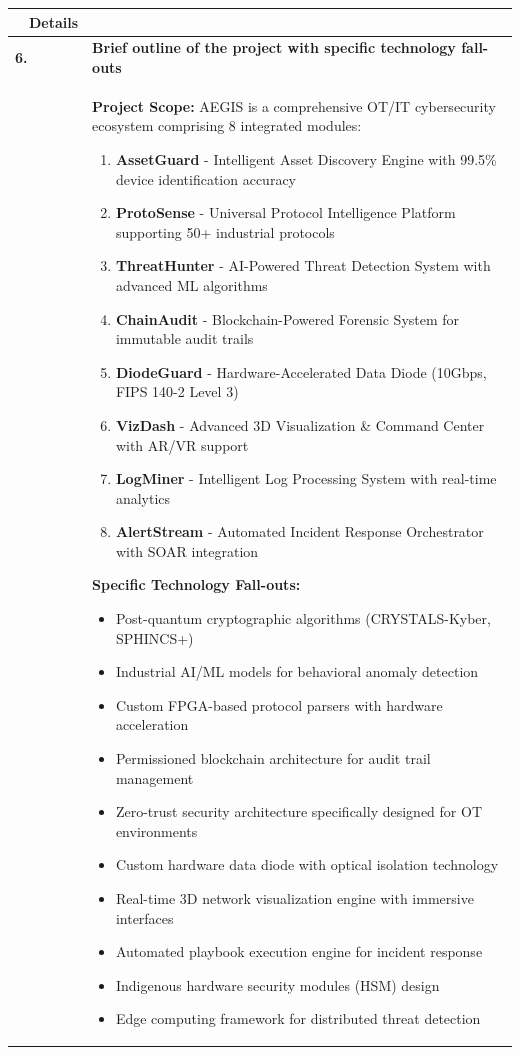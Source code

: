 \documentclass[12pt,a4paper]{article}
\begin{document}
\begin{longtable}{|p{0.5cm}p{3cm}|p{11cm}|}
\hline
\rowcolor{lightblue}
\multicolumn{2}{|c|}{\textbf{Field}} & \textbf{Details} \\
\hline
\endhead

\multicolumn{2}{|l|}{\textbf{6.}} & \textbf{Brief outline of the project with specific technology fall-outs} \\
\multicolumn{2}{|l|}{} & 
\textbf{Project Scope:} AEGIS is a comprehensive OT/IT cybersecurity ecosystem comprising 8 integrated modules:
\begin{enumerate}[leftmargin=1em, itemsep=0pt]
    \item \textbf{AssetGuard} - Intelligent Asset Discovery Engine with 99.5\% device identification accuracy
    \item \textbf{ProtoSense} - Universal Protocol Intelligence Platform supporting 50+ industrial protocols
    \item \textbf{ThreatHunter} - AI-Powered Threat Detection System with advanced ML algorithms
    \item \textbf{ChainAudit} - Blockchain-Powered Forensic System for immutable audit trails
    \item \textbf{DiodeGuard} - Hardware-Accelerated Data Diode (10Gbps, FIPS 140-2 Level 3)
    \item \textbf{VizDash} - Advanced 3D Visualization \& Command Center with AR/VR support
    \item \textbf{LogMiner} - Intelligent Log Processing System with real-time analytics
    \item \textbf{AlertStream} - Automated Incident Response Orchestrator with SOAR integration
\end{enumerate}

\textbf{Specific Technology Fall-outs:}
\begin{itemize}[leftmargin=1em, itemsep=0pt]
    \item Post-quantum cryptographic algorithms (CRYSTALS-Kyber, SPHINCS+)
    \item Industrial AI/ML models for behavioral anomaly detection
    \item Custom FPGA-based protocol parsers with hardware acceleration
    \item Permissioned blockchain architecture for audit trail management
    \item Zero-trust security architecture specifically designed for OT environments
    \item Custom hardware data diode with optical isolation technology
    \item Real-time 3D network visualization engine with immersive interfaces
    \item Automated playbook execution engine for incident response
    \item Indigenous hardware security modules (HSM) design
    \item Edge computing framework for distributed threat detection
\end{itemize} \\
\hline


\end{longtable}
\end{document}
